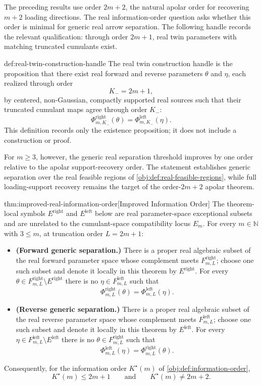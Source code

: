 The preceding results use order \(2m+2\), the natural apolar order for recovering \(m+2\) loading directions. The real information-order question asks whether this order is minimal for generic real arrow separation. The following handle records the relevant qualification: through order \(2m+1\), real twin parameters with matching truncated cumulants exist.

\begin{definitionv}{def:real-twin-construction-handle}
The real twin construction handle is the proposition that there exist real forward and reverse parameters \(\theta\) and \(\eta\), each realized through order
\[
K_-=2m+1,
\]
by centered, non-Gaussian, compactly supported real sources
such that their truncated cumulant maps agree through order \(K_-\):
\[
\Phi^{\mathrm{right}}_{m,K_-}(\theta)=\Phi^{\mathrm{left}}_{m,K_-}(\eta).
\]
This definition records only the existence proposition; it does not include a construction or proof.
\end{definitionv}

For \(m\ge3\), however, the generic real separation threshold improves by one order relative to the apolar support-recovery order. The statement establishes generic separation over the real feasible regions of \cref{obj:def:real-feasible-regions}, while full loading-support recovery remains the target of the order-\(2m+2\) apolar theorem.

\begin{theoremv}{thm:improved-real-information-order}[Improved Information Order]
The theorem-local symbols \(E^{\mathrm{right}}\) and \(E^{\mathrm{left}}\) below are real parameter-space exceptional subsets and are unrelated to the cumulant-space compatibility locus \(E_m\). For every \(m\in\mathbb N\) with \(3\le m\), at truncation order \(L=2m+1\):
\begin{itemize}
\item \textbf{(Forward generic separation.)} There is a proper real algebraic subset of the real forward parameter space whose complement meets \(F^{\mathrm{right}}_{m,L}\); choose one such subset and denote it locally in this theorem by \(E^{\mathrm{right}}\). For every \(\theta\in F^{\mathrm{right}}_{m,L}\setminus E^{\mathrm{right}}\) there is no \(\eta\in F^{\mathrm{left}}_{m,L}\) such that
\[
\Phi^{\mathrm{right}}_{m,L}(\theta)=\Phi^{\mathrm{left}}_{m,L}(\eta).
\]
\item \textbf{(Reverse generic separation.)} There is a proper real algebraic subset of the real reverse parameter space whose complement meets \(F^{\mathrm{left}}_{m,L}\); choose one such subset and denote it locally in this theorem by \(E^{\mathrm{left}}\). For every \(\eta\in F^{\mathrm{left}}_{m,L}\setminus E^{\mathrm{left}}\) there is no \(\theta\in F^{\mathrm{right}}_{m,L}\) such that
\[
\Phi^{\mathrm{left}}_{m,L}(\eta)=\Phi^{\mathrm{right}}_{m,L}(\theta).
\]
\end{itemize}
Consequently, for the information order \(K^\star(m)\) of \cref{obj:def:information-order},
\[
K^\star(m)\le 2m+1
\qquad\text{and}\qquad
K^\star(m)\ne 2m+2 .
\]
\end{theoremv}

